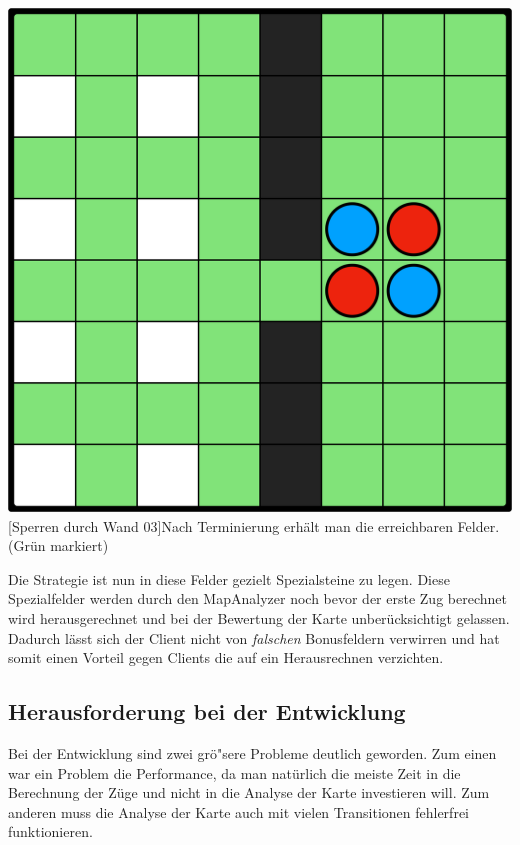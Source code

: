 \vspace{1em}
\begin{minipage}{\linewidth}
    \centering
    \includegraphics[width=0.45\linewidth]{pics/wall-reachable/wall-reachable-03}
    [Sperren durch Wand 03]{Nach Terminierung erh\"alt man die erreichbaren Felder. (Gr\"un markiert)}
    \label{fig:wall-reachable-03}
\end{minipage}
\vspace{0.5em}

Die Strategie ist nun in diese Felder gezielt Spezialsteine zu legen.
Diese Spezialfelder werden durch den MapAnalyzer noch bevor der erste Zug berechnet wird herausgerechnet und bei der Bewertung der Karte unber\"ucksichtigt gelassen.
Dadurch l\"asst sich der Client nicht von \textit{falschen} Bonusfeldern verwirren und hat somit einen Vorteil gegen Clients die auf ein Herausrechnen verzichten.

\subsection{Herausforderung bei der Entwicklung}\label{subsec:herausforderung-mapanalyzer}
Bei der Entwicklung sind zwei gr\"o"sere Probleme deutlich geworden.
Zum einen war ein Problem die Performance, da man nat\"urlich die meiste Zeit in die Berechnung der Z\"uge und nicht in die Analyse der Karte investieren will.
Zum anderen muss die Analyse der Karte auch mit vielen Transitionen fehlerfrei funktionieren.

